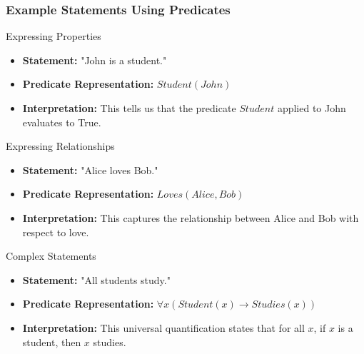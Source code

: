 \documentclass[aspectratio=169]{beamer}
\begin{document}
\begin{frame}[fragile]
    \frametitle{Example Statements Using Predicates}
    \begin{block}{Expressing Properties}
        \begin{itemize}
            \item \textbf{Statement:} "John is a student."
            \item \textbf{Predicate Representation:} $Student(John)$
            \item \textbf{Interpretation:} This tells us that the predicate $Student$ applied to John evaluates to True.
        \end{itemize}
    \end{block}

    \begin{block}{Expressing Relationships}
        \begin{itemize}
            \item \textbf{Statement:} "Alice loves Bob."
            \item \textbf{Predicate Representation:} $Loves(Alice, Bob)$
            \item \textbf{Interpretation:} This captures the relationship between Alice and Bob with respect to love.
        \end{itemize}
    \end{block}

    \begin{block}{Complex Statements}
        \begin{itemize}
            \item \textbf{Statement:} "All students study."
            \item \textbf{Predicate Representation:} $\forall x (Student(x) \rightarrow Studies(x))$
            \item \textbf{Interpretation:} This universal quantification states that for all $x$, if $x$ is a student, then $x$ studies.
        \end{itemize}
    \end{block}
\end{frame}
\end{document}
